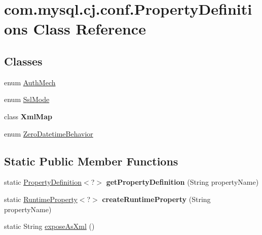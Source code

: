 \hypertarget{classcom_1_1mysql_1_1cj_1_1conf_1_1_property_definitions}{}\section{com.\+mysql.\+cj.\+conf.\+Property\+Definitions Class Reference}
\label{classcom_1_1mysql_1_1cj_1_1conf_1_1_property_definitions}
\subsection*{Classes}
\begin{DoxyCompactItemize}
\item 
enum \mbox{\hyperlink{enumcom_1_1mysql_1_1cj_1_1conf_1_1_property_definitions_1_1_auth_mech}{Auth\+Mech}}
\item 
enum \mbox{\hyperlink{enumcom_1_1mysql_1_1cj_1_1conf_1_1_property_definitions_1_1_ssl_mode}{Ssl\+Mode}}
\item 
class {\bfseries Xml\+Map}
\item 
enum \mbox{\hyperlink{enumcom_1_1mysql_1_1cj_1_1conf_1_1_property_definitions_1_1_zero_datetime_behavior}{Zero\+Datetime\+Behavior}}
\end{DoxyCompactItemize}
\subsection*{Static Public Member Functions}
\begin{DoxyCompactItemize}
\item 
\mbox{\label{classcom_1_1mysql_1_1cj_1_1conf_1_1_property_definitions_afd49a84fa2e960cf885e7925aa9d0157}} 
static \mbox{\hyperlink{interfacecom_1_1mysql_1_1cj_1_1conf_1_1_property_definition}{Property\+Definition}}$<$?$>$ {\bfseries get\+Property\+Definition} (String property\+Name)
\item 
\mbox{\label{classcom_1_1mysql_1_1cj_1_1conf_1_1_property_definitions_aae888406fd8c1443f194fba0e46f371a}} 
static \mbox{\hyperlink{interfacecom_1_1mysql_1_1cj_1_1conf_1_1_runtime_property}{Runtime\+Property}}$<$?$>$ {\bfseries create\+Runtime\+Property} (String property\+Name)
\item 
static String \mbox{\hyperlink{classcom_1_1mysql_1_1cj_1_1conf_1_1_property_definitions_a2813d1ea118b8aae2ca6dd7933edba5d}{expose\+As\+Xml}} ()
\end{DoxyCompactItemize}
